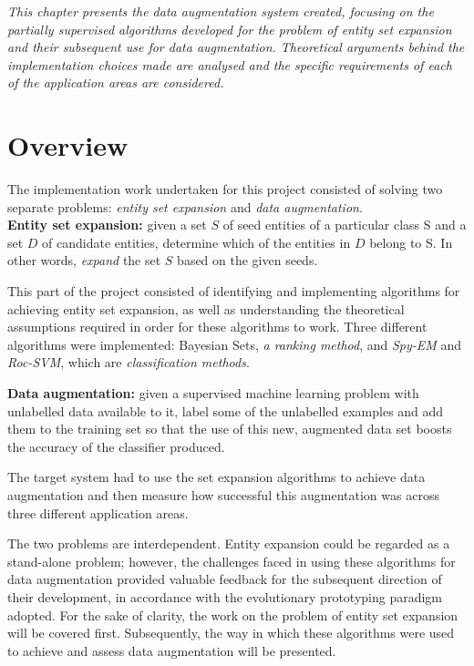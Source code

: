 \documentclass[12pt,twoside,notitlepage,amsart]{report} %
\begin{document}
	\emph{This chapter presents the data augmentation system created, focusing on the partially supervised algorithms developed for the problem of entity set expansion and their subsequent use for data augmentation. Theoretical arguments behind the implementation choices made are analysed and the specific requirements of each of the application areas are considered. } 
	
	\section{Overview} %
	
	The implementation work undertaken for this project consisted of solving two separate problems: \emph{entity set expansion} and \emph{data augmentation}. \\
	
	\textbf{Entity set expansion:} given a set $S$ of seed entities of a particular class S and a set $D$ of candidate entities, determine which of the entities in $D$ belong to S. In other words, \emph{expand} the set $S$ based on the given seeds. 
	
	This part of the project consisted of identifying and implementing  algorithms for achieving entity set expansion, as well as understanding the theoretical assumptions required in order for these algorithms to work. Three different algorithms were implemented: Bayesian Sets, \emph{a ranking method}, and \emph{Spy-EM} and \emph{Roc-SVM}, which are \emph{classification methods}.
	
	\textbf{Data augmentation:} given a supervised machine learning problem with unlabelled data available to it, label some of the unlabelled examples and add them to the training set so that the use of this new, augmented data set boosts the accuracy of the classifier produced. 
	
	The target system had to use the set expansion algorithms to achieve data augmentation and then measure how successful this augmentation was across three different application areas.
	 
	The two problems are interdependent. Entity expansion could be regarded as a stand-alone problem; however, the challenges faced in using these algorithms for data augmentation provided valuable feedback for the subsequent direction of their development, in accordance with the evolutionary prototyping paradigm adopted. For the sake of clarity, the work on the problem of entity set expansion will be covered first. Subsequently, the way in which these algorithms were used to achieve and assess data augmentation will be presented. 
	 
\end{document}
